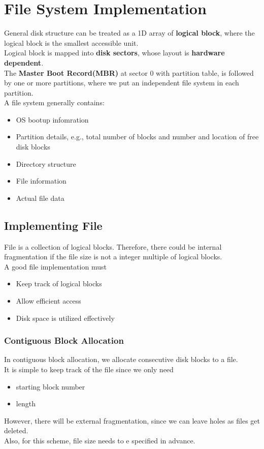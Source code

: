 \documentclass[12pt]{article}
\theoremstyle{definition}
\begin{document}
\section{File System Implementation}
General disk structure can be treated as a 1D array of \textbf{logical block}, where the logical block is the smallest accessible unit.\\Logical block is mapped into \textbf{disk sectors}, whose layout is \textbf{hardware dependent}.\\
The \textbf{Master Boot Record(MBR)} at sector $0$ with partition table, is followed by one or more partitions, where we 
put an independent file system in each partition.\\
A file system generally contains:
\begin{itemize}
  \item OS bootup infomration
  \item Partition details, e.g., total number of blocks and number and location of free disk blocks
  \item Directory structure
  \item File information
  \item Actual file data
\end{itemize}
\subsection{Implementing File}
File is a collection of logical blocks. Therefore, there could be internal fragmentation if the file size is not a integer multiple of logical blocks.\\
A good file implementation must
\begin{itemize}
  \item Keep track of logical blocks
  \item Allow efficient access
  \item Disk space is utilized effectively
\end{itemize}
\subsubsection{Contiguous Block Allocation}
In contiguous block allocation, we allocate consecutive disk blocks to a file.\\
It is simple to keep track of the file since we only need 
\begin{itemize}
  \item starting block number
  \item length
\end{itemize}
However, there will be external fragmentation, since we can leave holes as files get deleted.\\
Also, for this scheme, file size needs to e specified in advance.
\end{document}
